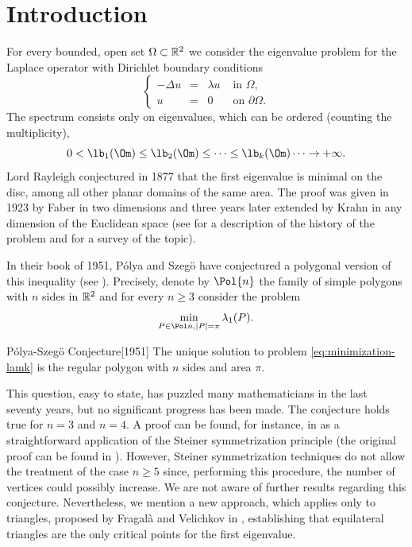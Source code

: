 
\section{Introduction}

For every bounded, open set $\Omega \subset \Bbb{R}^2$ we consider the eigenvalue problem for the Laplace operator with Dirichlet boundary conditions
\begin{equation}\left\{ \begin{array}{rcll}
-\Delta u & =& \lambda u & \text{ in }\Omega,\\
u &= &0 & \text{ on }\partial \Omega.
\end{array} \right.
\label{eq:dir-eigenvalue}
\end{equation}
The spectrum consists only on eigenvalues, which can be ordered (counting the multiplicity),
\[
0< \lb_1(\Om) \le \lb_2(\Om) \le \dots \le \lb_k(\Om) \cdots \to +\infty.
\]
Lord Rayleigh conjectured in 1877 that the first eigenvalue is minimal on the disc, among all other planar domains of the same area. The proof was given in 1923 by Faber in two dimensions and three years later extended by Krahn in any dimension of the Euclidean space (see \cite{Da11} for a description of the history of the problem and \cite{he17b,henroteigs} for a survey of the topic).

In their book of 1951, Pólya and Szegö have conjectured a polygonal version of this inequality (see \cite[p.\,158]{PoSz51}). Precisely, denote by $\Pol{n}$ the family of simple polygons with $n$ sides in $\Bbb{R}^2$ and for every $n \geq 3$ consider the problem
\begin{equation}
\min_{P \in \Pol n, |P| = \pi} \lambda_1(P).
\label{eq:minimization-lamk}
\end{equation}

\begin{enonce*}{Pólya-Szegö Conjecture}[1951]
The unique solution to problem \eqref{eq:minimization-lamk} is the regular polygon with $n$ sides and area $\pi$.
\end{enonce*}

This question, easy to state, has puzzled many mathematicians in the last seventy years, but no significant progress has been made.
The conjecture holds true for $n=3$ and $n=4$. A proof can be found, for instance, in \cite{henroteigs} as a straightforward application of the Steiner symmetrization principle (the original proof can be found in \cite{PoSz51}). However, Steiner symmetrization techniques do not allow the treatment of the case $n \geq 5$ since, performing this procedure, the number of vertices could possibly increase. We are not aware of further results regarding this conjecture. Nevertheless, we mention a new approach, which applies only to triangles, proposed by Fragalà and Velichkov in \cite{FragalaVelichkov19}, establishing that equilateral triangles are the only critical points for the first eigenvalue.

